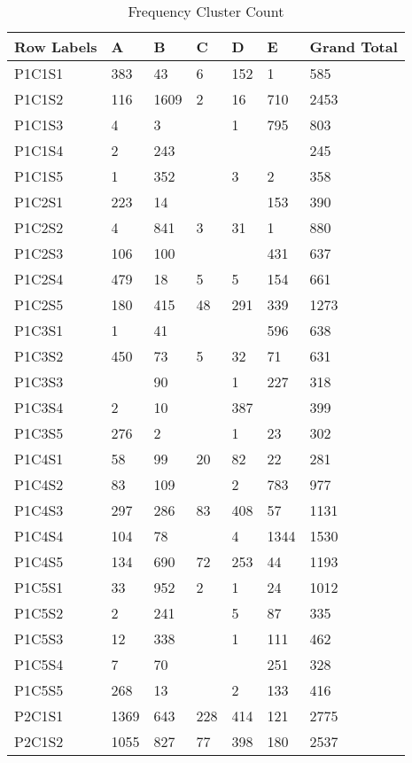 \begin{longtable}{|l|l|l|l|l|l|l|}
\caption{Frequency Cluster Count}
\label{my-label}\\
\hline
Row Labels & A & B & C & D & E & Grand Total \\ \hline
\endfirsthead
\endhead
%
P1C1S1 & 383 & 43 & 6 & 152 & 1 & 585 \\ \hline
P1C1S2 & 116 & 1609 & 2 & 16 & 710 & 2453 \\ \hline
P1C1S3 & 4 & 3 &  & 1 & 795 & 803 \\ \hline
P1C1S4 & 2 & 243 &  &  &  & 245 \\ \hline
P1C1S5 & 1 & 352 &  & 3 & 2 & 358 \\ \hline
P1C2S1 & 223 & 14 &  &  & 153 & 390 \\ \hline
P1C2S2 & 4 & 841 & 3 & 31 & 1 & 880 \\ \hline
P1C2S3 & 106 & 100 &  &  & 431 & 637 \\ \hline
P1C2S4 & 479 & 18 & 5 & 5 & 154 & 661 \\ \hline
P1C2S5 & 180 & 415 & 48 & 291 & 339 & 1273 \\ \hline
P1C3S1 & 1 & 41 &  &  & 596 & 638 \\ \hline
P1C3S2 & 450 & 73 & 5 & 32 & 71 & 631 \\ \hline
P1C3S3 &  & 90 &  & 1 & 227 & 318 \\ \hline
P1C3S4 & 2 & 10 &  & 387 &  & 399 \\ \hline
P1C3S5 & 276 & 2 &  & 1 & 23 & 302 \\ \hline
P1C4S1 & 58 & 99 & 20 & 82 & 22 & 281 \\ \hline
P1C4S2 & 83 & 109 &  & 2 & 783 & 977 \\ \hline
P1C4S3 & 297 & 286 & 83 & 408 & 57 & 1131 \\ \hline
P1C4S4 & 104 & 78 &  & 4 & 1344 & 1530 \\ \hline
P1C4S5 & 134 & 690 & 72 & 253 & 44 & 1193 \\ \hline
P1C5S1 & 33 & 952 & 2 & 1 & 24 & 1012 \\ \hline
P1C5S2 & 2 & 241 &  & 5 & 87 & 335 \\ \hline
P1C5S3 & 12 & 338 &  & 1 & 111 & 462 \\ \hline
P1C5S4 & 7 & 70 &  &  & 251 & 328 \\ \hline
P1C5S5 & 268 & 13 &  & 2 & 133 & 416 \\ \hline
P2C1S1 & 1369 & 643 & 228 & 414 & 121 & 2775 \\ \hline
P2C1S2 & 1055 & 827 & 77 & 398 & 180 & 2537 \\ \hline

\end{longtable}
